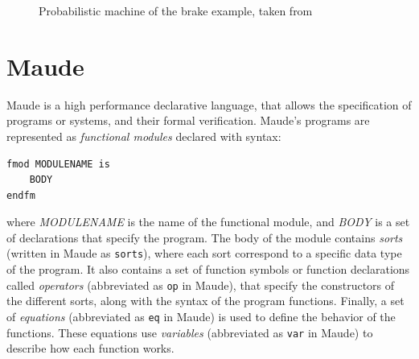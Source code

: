 \begin{figure}[h]
    \quad
    \caption{Probabilistic machine of the brake example, taken from \cite{Aouadhi2017}}
    \label{fig:brake3}
\end{figure}




\section{Maude}

Maude \cite{MaudeManual, PeterMaude, Lecture1} is a high performance declarative language, that allows the specification of programs or systems, and their formal verification.
Maude's programs are represented as \textit{functional modules} declared with syntax:
\begin{lstlisting}
fmod MODULENAME is
    BODY
endfm
\end{lstlisting}
where \textit{MODULENAME} is the name of the functional module, and \textit{BODY} is a set of declarations that specify the program. The body of the module contains \textit{sorts} (written in Maude as \texttt{sorts}), where each sort correspond to a specific data type of the program. It also contains a set of function symbols or function declarations called \textit{operators} (abbreviated as \texttt{op} in Maude), that specify the constructors of the different sorts, along with the syntax of the program functions. Finally, a set of \textit{equations} (abbreviated as \texttt{eq} in Maude) is used to define the behavior of the functions. These equations use \textit{variables} (abbreviated as \texttt{var} in Maude) to describe how each function works. 

